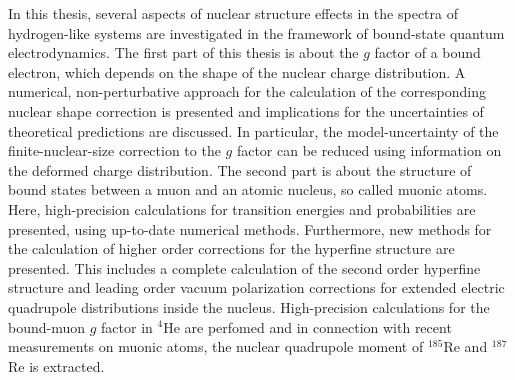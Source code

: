 
{
In this thesis, several aspects of nuclear structure effects in the spectra of hydrogen-like systems are investigated in the framework of bound-state quantum electrodynamics. The first part of this thesis is about the $g$ factor of a bound electron, which depends on the shape of the nuclear charge distribution. 
A numerical, non-perturbative approach for the calculation of the corresponding nuclear shape correction is presented and implications for the uncertainties of theoretical predictions are discussed. In particular, the model-uncertainty of the finite-nuclear-size correction to the $g$ factor can be reduced using information on the deformed charge distribution.
The second part is about the structure of bound states between a muon and an atomic nucleus, so called muonic atoms. Here, high-precision calculations for transition energies and probabilities are presented, using up-to-date numerical methods. Furthermore, new methods for the calculation of higher order corrections for the hyperfine structure are presented. This includes a complete calculation of the second order hyperfine structure and leading order vacuum polarization corrections for extended electric quadrupole distributions inside the nucleus.
High-precision calculations for the bound-muon $g$ factor in $^{4}$He are perfomed and in connection with recent measurements on muonic atoms, the nuclear quadrupole moment of $^{185}$Re and $^{187}$Re is extracted.
}

\thispagestyle{empty}
